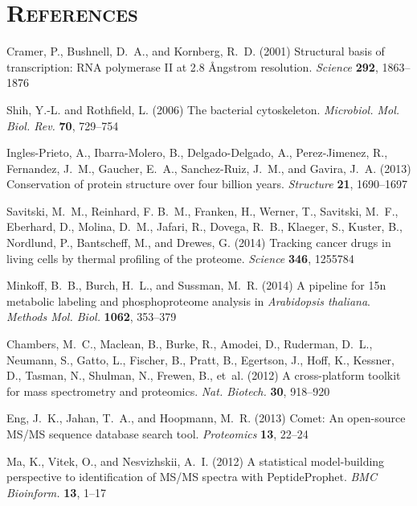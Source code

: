 \documentclass[11pt,letter]{article}\usepackage[]{graphicx}\usepackage[]{color}
\begin{document}
\section*{\textsc{References}}
\begin{thebibliography}{}

Cramer, P., Bushnell, D.~A., and Kornberg, R.~D. (2001) Structural basis of
  transcription: {RNA} polymerase {II} at 2.8 Ångstrom resolution.
  {\emph{Science}} {\bf 292}, 1863--1876

Shih, Y.-L. and Rothfield, L. (2006) The bacterial cytoskeleton.
  {\emph{Microbiol. Mol. Biol. Rev.}} {\bf 70}, 729--754

Ingles-Prieto, A., Ibarra-Molero, B., Delgado-Delgado, A., Perez-Jimenez, R.,
  Fernandez, J.~M., Gaucher, E.~A., Sanchez-Ruiz, J.~M., and Gavira, J.~A.
  (2013) Conservation of protein structure over four billion years.
  {\emph{Structure}} {\bf 21}, 1690--1697

Savitski, M.~M., Reinhard, F. B.~M., Franken, H., Werner, T., Savitski, M.~F.,
  Eberhard, D., Molina, D.~M., Jafari, R., Dovega, R.~B., Klaeger, S., Kuster,
  B., Nordlund, P., Bantscheff, M., and Drewes, G. (2014) Tracking cancer drugs
  in living cells by thermal profiling of the proteome. {\emph{Science}} {\bf
  346}, 1255784

Minkoff, B.~B., Burch, H.~L., and Sussman, M.~R. (2014) A pipeline for 15n
  metabolic labeling and phosphoproteome analysis in \textit{{Arabidopsis}
  thaliana}. {\emph{Methods Mol. Biol.}} {\bf 1062}, 353--379

Chambers, M.~C., Maclean, B., Burke, R., Amodei, D., Ruderman, D.~L., Neumann,
  S., Gatto, L., Fischer, B., Pratt, B., Egertson, J., Hoff, K., Kessner, D.,
  Tasman, N., Shulman, N., Frewen, B., et~al. (2012) A cross-platform toolkit
  for mass spectrometry and proteomics. {\emph{Nat. Biotech.}} {\bf 30},
  918--920

Eng, J.~K., Jahan, T.~A., and Hoopmann, M.~R. (2013) Comet: {An} open-source
  {MS}/{MS} sequence database search tool. {\emph{Proteomics}} {\bf 13}, 22--24

Ma, K., Vitek, O., and Nesvizhskii, A.~I. (2012) A statistical model-building
  perspective to identification of {MS}/{MS} spectra with {PeptideProphet}.
  {\emph{BMC Bioinform.}} {\bf 13}, 1--17


\end{thebibliography}
\end{document}
